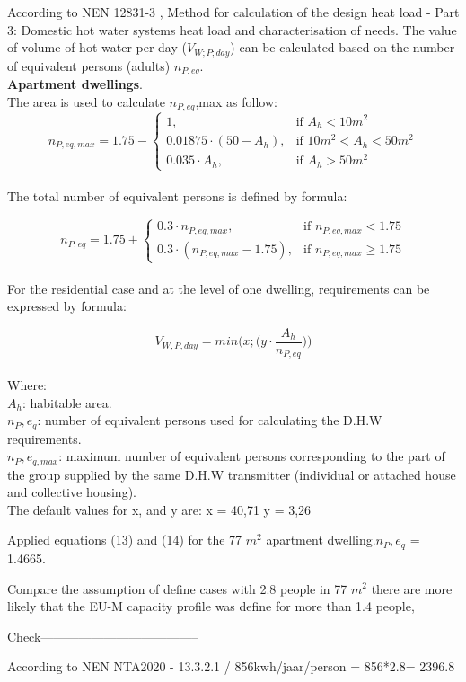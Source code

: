 According to NEN 12831-3 \cite{NEN12831}, Method for calculation of the design heat load - Part 3:  Domestic hot water systems heat load and characterisation of needs. The value of volume of hot water per day ($V_{W;P;day}$) can be calculated based on the number of equivalent persons (adults) $n_{P,eq}$.
\vspace{2mm}
\\
\textbf{Apartment dwellings}.\\
The area is used to calculate $n_{P,eq}$,max as follow: 
\begin{equation}
    n_{P,eq,max}= 1.75 - \begin{cases}
			1, & \text{if $A_{h} < 10 m^2$}\\
            0.01875\cdot(50 - A_h), & \text{if $10 m^2 <A_{h} < 50 m^2$}\\
            0.035\cdot A_h, & \text{if $A_{h} > 50 m^2$}
		 \end{cases}
\end{equation}\\
The total number of equivalent persons is defined by formula:


\begin{equation}
    n_{P,eq}= 1.75 + \begin{cases}
			0.3\cdot n_{P,eq,max}, & \text{if $n_{P,eq,max} < 1.75$}\\
            0.3\cdot(n_{P,eq,max}- 1.75), & \text{if $n_{P,eq,max} \geq 1.75$}
		 \end{cases}
\end{equation}\\
For the residential case and at the level of one dwelling, requirements can be expressed by formula:


\begin{equation}
   V_{W,P,day} = min\Big(x;\Big(y\cdot \frac{A_h}{n_{P,eq}}\Big)\Big)
\end{equation}\\
Where:\\ 
$A_{h}$: habitable area.\\
$n_{P},e_{q}$: number of equivalent persons used for calculating the D.H.W requirements.\\
$n_{P},e_{q,max}$: maximum number of equivalent persons corresponding to the part of the group supplied by the same D.H.W transmitter (individual or attached house and collective housing).\\
The default values for x, and y are:
x = 40,71
y = 3,26 \cite{NEN12831}

Applied equations (13) and (14) for the 77 $m^2$ apartment dwelling.$n_{P},e_{q}$ = 1.4665.

Compare the assumption of define cases with 2.8 people in 77 $m^2$ there are more likely that the EU-M capacity profile was define for more than 1.4 people,


Check--------------------------------------

According to NEN NTA2020 - 13.3.2.1 / 856kwh/jaar/person = 856*2.8= 2396.8

